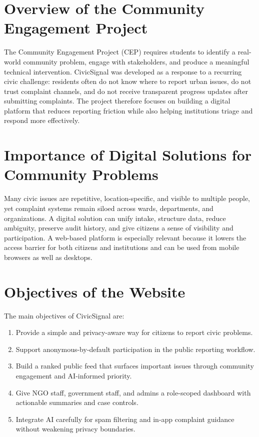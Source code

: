 \documentclass[12pt,a4paper]{report}
\begin{document}
\section{Overview of the Community Engagement Project}
The Community Engagement Project (CEP) requires students to identify a real-world community problem, engage with stakeholders, and produce a meaningful technical intervention. CivicSignal was developed as a response to a recurring civic challenge: residents often do not know where to report urban issues, do not trust complaint channels, and do not receive transparent progress updates after submitting complaints. The project therefore focuses on building a digital platform that reduces reporting friction while also helping institutions triage and respond more effectively.

\section{Importance of Digital Solutions for Community Problems}
Many civic issues are repetitive, location-specific, and visible to multiple people, yet complaint systems remain siloed across wards, departments, and organizations. A digital solution can unify intake, structure data, reduce ambiguity, preserve audit history, and give citizens a sense of visibility and participation. A web-based platform is especially relevant because it lowers the access barrier for both citizens and institutions and can be used from mobile browsers as well as desktops.

\section{Objectives of the Website}
The main objectives of CivicSignal are:
\begin{enumerate}
  \item Provide a simple and privacy-aware way for citizens to report civic problems.
  \item Support anonymous-by-default participation in the public reporting workflow.
  \item Build a ranked public feed that surfaces important issues through community engagement and AI-informed priority.
  \item Give NGO staff, government staff, and admins a role-scoped dashboard with actionable summaries and case controls.
  \item Integrate AI carefully for spam filtering and in-app complaint guidance without weakening privacy boundaries.
\end{enumerate}
\end{document}
